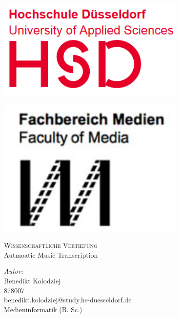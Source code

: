 \begin{titlepage}
    \thispagestyle{empty}

    \vspace*{1cm} %
    \begin{minipage}{0.45\textwidth}
        \raggedright
        \includegraphics[width=0.7\textwidth]{Graphics/HSDLogo} %
    \end{minipage}%
    \hfill
    \begin{minipage}{0.45\textwidth}
        \raggedleft
        \includegraphics[width=0.7\textwidth]{Graphics/FacultyOfMedia} %
    \end{minipage}

    \vspace{1.5cm} %

    \center

    \textsc{\large Wissenschaftliche Vertiefung}\\
    \vspace{1cm}
    \Large{Autmoatic Music Transcription}
    \vspace{2cm}

    \begin{center}
        \textit{Autor:} \\
        Benedikt Kolodziej \\
        878007 \\
        benedikt.kolodziej@study.hs-duesseldorf.de   \\
        Medieninformatik (B. Sc.) \\[1cm]


\end{center}
\end{titlepage}
